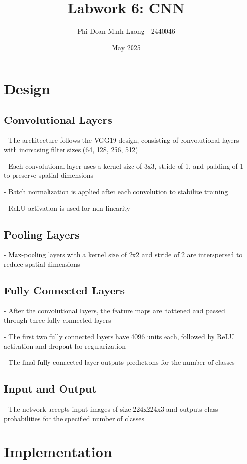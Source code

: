 \documentclass{article}
\title{Labwork 6: CNN}
\author{Phi Doan Minh Luong - 2440046}
\date{May 2025}
\begin{document}
\maketitle

\setlength\parindent{0pt}

\section{Design}
\subsection{Convolutional Layers}
- The architecture follows the VGG19 design, consisting of convolutional layers with increasing filter sizes (64, 128, 256, 512)

- Each convolutional layer uses a kernel size of 3x3, stride of 1, and padding of 1 to preserve spatial dimensions

- Batch normalization is applied after each convolution to stabilize training

- ReLU activation is used for non-linearity

\subsection{Pooling Layers}
- Max-pooling layers with a kernel size of 2x2 and stride of 2 are interspersed to reduce spatial dimensions

\subsection{Fully Connected Layers}
- After the convolutional layers, the feature maps are flattened and passed through three fully connected layers

- The first two fully connected layers have 4096 units each, followed by ReLU activation and dropout for regularization

- The final fully connected layer outputs predictions for the number of classes

\subsection{Input and Output}
- The network accepts input images of size 224x224x3 and outputs class probabilities for the specified number of classes

\section{Implementation}
\end{document}
